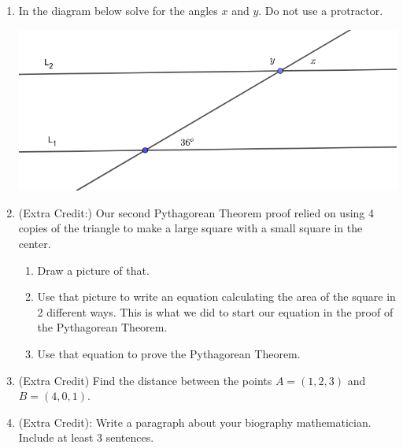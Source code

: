 \documentclass[12pt]{article}
\begin{document}
\begin{enumerate}
\item In the diagram below solve for the angles $x$ and $y$.  Do not use a protractor.

\includegraphics[width=5.5in]{parallel-find-angle-1.png}
\item (Extra Credit:) Our second Pythagorean Theorem proof relied on using 4 copies of the triangle to make a large square with a small square in the center.
\begin{enumerate}
	\item Draw a picture of that.
	\item Use that picture to write an equation calculating the area of the square in 2 different ways.  This is what we did to start our equation in the proof of the Pythagorean Theorem.
	\item Use that equation to prove the Pythagorean Theorem.
\end{enumerate}

\item (Extra Credit) Find the distance between the points $A=(1, 2, 3)$ and $B=(4, 0, 1)$.



\item (Extra Credit): Write a paragraph about your biography mathematician.  Include at least 3 sentences.
\end{enumerate}
\end{document}
